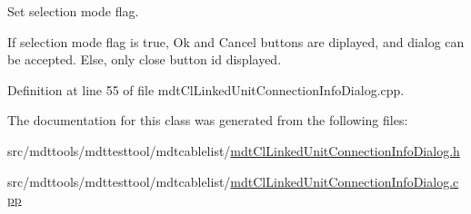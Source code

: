 Set selection mode flag. 

If selection mode flag is true, Ok and Cancel buttons are diplayed, and dialog can be accepted. Else, only close button id displayed. 

Definition at line 55 of file mdt\-Cl\-Linked\-Unit\-Connection\-Info\-Dialog.\-cpp.



The documentation for this class was generated from the following files\-:\begin{DoxyCompactItemize}
\item 
src/mdttools/mdttesttool/mdtcablelist/\hyperlink{mdt_cl_linked_unit_connection_info_dialog_8h}{mdt\-Cl\-Linked\-Unit\-Connection\-Info\-Dialog.\-h}\item 
src/mdttools/mdttesttool/mdtcablelist/\hyperlink{mdt_cl_linked_unit_connection_info_dialog_8cpp}{mdt\-Cl\-Linked\-Unit\-Connection\-Info\-Dialog.\-cpp}\end{DoxyCompactItemize}
